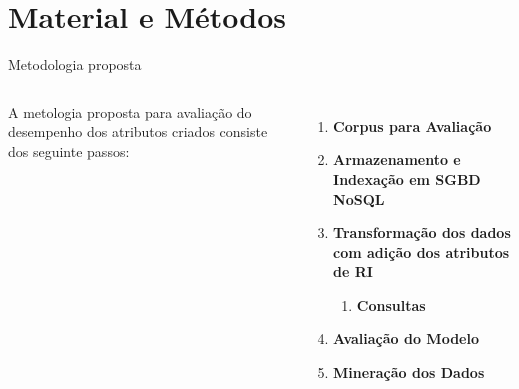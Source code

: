 \documentclass[%
  10pt,%
  aspectratio = 169,%
  compress,%
  t,%
]{beamer}%
\begin{document}
\section{Material e Métodos}\label{sec:matmet}

    \begin{frame}{}{Metodologia proposta}
        \begin{columns}[t]
            A metologia proposta para avaliação do desempenho dos atributos criados consiste dos seguinte passos:

            \begin{enumerate}
                \item \textbf{Corpus para Avaliação}
                \item \textbf{Armazenamento e Indexação em  SGBD NoSQL}
                \item \textbf{Transformação dos dados com adição dos atributos de RI}
                \begin{enumerate}
                    \item \textbf{Consultas}
                \end{enumerate}
                \item \textbf{Avaliação do Modelo}

                \item \textbf{Mineração dos Dados}
            \end{enumerate}

            
        \end{columns}
    \end{frame}
\end{document}
